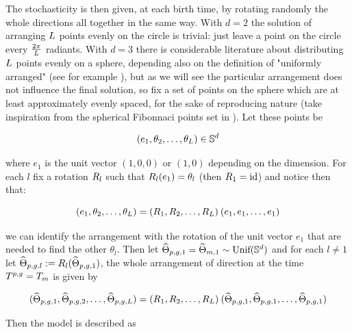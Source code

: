 The stochasticity is then given, at each birth time, by rotating randomly the whole directions all together in the same way.
With $d=2$ the solution of arranging $L$ points evenly on the circle is trivial: just leave a point on the circle every $\frac{2\pi}{L}$ radiants.
With $d=3$ there is considerable literature about distributing $L$ points evenly on a sphere, depending also on the definition of "uniformly arranged" (see for example \cite{spherical-codes-and-designs}), but as we will see the particular arrangement does not influence the final solution, so fix a set of points on the sphere which are at least approximately evenly spaced, for the sake of reproducing nature (\eg take inspiration from the spherical Fibonnaci points set in \cite{spherical-fibonacci-example}).
Let these points be

\begin{equation*}
	(e_1, \theta_2, \ldots, \theta_L) \in \mathbb{S}^d
\end{equation*}

where $e_1$ is the unit vector $(1, 0, 0)$ or $(1,0)$ depending on the dimension.
For each $l$ fix a rotation $R_l$ such that $R_l(e_1) = \theta_l$ (then $R_1 = \text{id}$) and notice then that:

\begin{equation*}
	(e_1, \theta_2, \ldots, \theta_L) = (R_1, R_2, \ldots, R_L)\: (e_1, e_1, \ldots, e_1)
\end{equation*}

\ie we can identify the arrangement with the rotation of the unit vector $e_1$ that are needed to find the other $\theta_l$.
Then let $\widehat{\Theta}_{p,g,1} = \widehat{\Theta}_{m,1} \sim \text{Unif}(\mathbb{S}^d)$ and for each $l \neq 1$ let $\widehat{\Theta}_{p,g,l}:= R_l (\widehat{\Theta}_{p,g,1})$, \ie the whole arrangement of direction at the time $T^{p,g} = T_m$ is given by

\begin{equation*}
	(\widehat{\Theta}_{p,g,1}, \widehat{\Theta}_{p,g,2}, \ldots, \widehat{\Theta}_{p,g,L}) = (R_1, R_2, \ldots, R_L)\: (\widehat{\Theta}_{p,g,1}, \widehat{\Theta}_{p,g,1}, \ldots, \widehat{\Theta}_{p,g,1})
\end{equation*}

Then the model is described as

